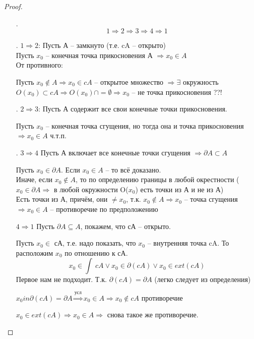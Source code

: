 \documentclass{book}
\begin{document}
\begin{proof}\
	\begin{itemize}
	
	
	\item[.]$$1 \Rightarrow 2 \Rightarrow 3 \Rightarrow 4 \Rightarrow 1$$
	\item[.]$1\Rightarrow 2$: Пусть А -- замкнуто (т.е. cA -- открыто)\\
	Пусть $x_0$ -- конечная точка прикосновения А $\Rightarrow x_0 \in A$\\
	От противного:
	
	Пусть $x_0 \notin A \Rightarrow x_0 \in cA$ -- открытое множество $\Rightarrow \exists$ окружность $O(x_0) \subset cA \Rightarrow O(x_0)\cap = \emptyset \Rightarrow x_0$ -- не точка прикосновения ??!
	
	\item[.]$2\Rightarrow 3$: Пусть А содержит все свои конечные точки прикосновения.
	
	Пусть $x_0$ -- конечная точка сгущения, но тогда она и точка прикосновения$\Rightarrow x_0 \in A$ ч.т.п.
	 
	\item[.]$3 \Rightarrow 4$ Пусть А включает все конечные точки сгущения $\Rightarrow \partial A \subset A$
	
	 Пусть $x_0 \in \partial A$. Если $x_0 \in A$ -- то всё доказано.\\
	 Иначе, если $x_0 \notin A$, то по определению границы в любой окрестности ($x_0 \in \partial A \Rightarrow $ в любой окружности O($x_0$) есть точки из А и не из А)\\
	 Есть точки из А, причём, они $\neq x_0$, т.к. $x_0 \notin A \Rightarrow x_0$ -- точка сгущения $\Rightarrow x_0 \in A$ -- противоречие по предположению 
	 \item[$4 \Rightarrow 1$] Пусть $\partial A \subseteq A$, покажем, что сА -- открыто.
	 
	 Пусть $x_0 \in $  сА, т.е. надо показать, что $x_0$ -- внутренняя точка cA. То расположим $x_0$ по отношению к сА. \[x_0 \in \int~cA \vee x_0 \in \partial(cA) \vee x_0 \in ext(cA)\]
	 Первое нам не подходит. Т.к. $ \partial(cA)=\partial A$ (легко следует из определения)
	 
	 $x_0in \partial(cA) = \partial A \overset{\texttt{усл}}{\Rightarrow} x_0 \in A \Rightarrow x_0 \notin cA$ противоречие
	 
	 $x_0 \in ext(cA) \Rightarrow x_0 \in A \Rightarrow$ снова такое же противоречие.
	 
	  
	\end{itemize}
\end{proof}
\end{document}
